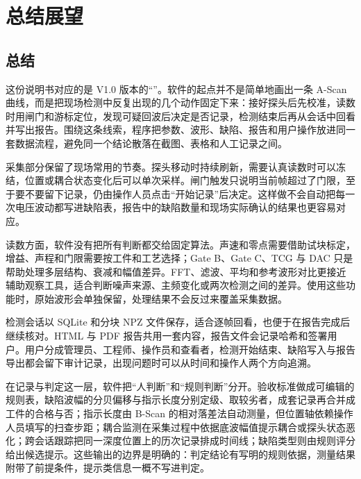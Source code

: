 %
%
\section{总结展望}

\subsection{总结}
\par
这份说明书对应的是 V1.0 版本的“\SoftwareName”。软件的起点并不是简单地画出一条 A-Scan 曲线，而是把现场检测中反复出现的几个动作固定下来：接好探头后先校准，读数时用闸门和游标定位，发现可疑回波后决定是否记录，检测结束后再从会话中回看并写出报告。围绕这条线索，程序把参数、波形、缺陷、报告和用户操作放进同一套数据流程，避免同一个结论散落在截图、表格和人工记录之间。
\par
采集部分保留了现场常用的节奏。探头移动时持续刷新，需要认真读数时可以冻结，位置或耦合状态变化后可以单次采样。闸门触发只说明当前帧超过了门限，至于要不要留下记录，仍由操作人员点击“开始记录”后决定。这样做不会自动把每一次电压波动都写进缺陷表，报告中的缺陷数量和现场实际确认的结果也更容易对应。
\par
读数方面，软件没有把所有判断都交给固定算法。声速和零点需要借助试块标定，增益、声程和门限需要按工件和工艺选择；Gate B、Gate C、TCG 与 DAC 只是帮助处理多层结构、衰减和幅值差异。FFT、滤波、平均和参考波形对比更接近辅助观察工具，适合判断噪声来源、主频变化或两次检测之间的差异。使用这些功能时，原始波形会单独保留，处理结果不会反过来覆盖采集数据。
\par
检测会话以 SQLite 和分块 NPZ 文件保存，适合逐帧回看，也便于在报告完成后继续核对。HTML 与 PDF 报告共用一套内容，报告文件会记录哈希和签署用户。用户分成管理员、工程师、操作员和查看者，检测开始结束、缺陷写入与报告导出都会留下审计记录，出现问题时可以从时间和操作人两个方向追溯。
\par
在记录与判定这一层，软件把“人判断”和“规则判断”分开。验收标准做成可编辑的规则表，缺陷波幅的分贝偏移与指示长度分别定级、取较劣者，成套记录再合并成工件的合格与否；指示长度由 B-Scan 的相对落差法自动测量，但位置轴依赖操作人员填写的扫查步距；耦合监测在采集过程中依据底波幅值提示耦合或探头状态恶化；跨会话跟踪把同一深度位置上的历次记录排成时间线；缺陷类型则由规则评分给出候选提示。这些输出的边界是明确的：判定结论有写明的规则依据，测量结果附带了前提条件，提示类信息一概不写进判定。

